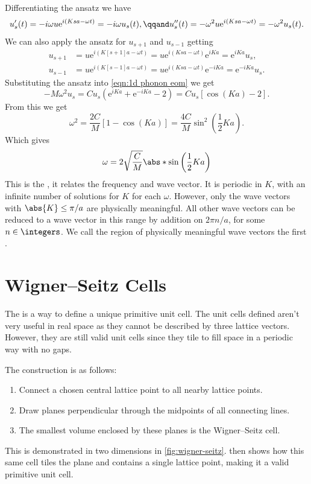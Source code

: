 \documentclass[fleqn]{NotesClass}
\newcommand*{\e}{\mathrm{e}}
\begin{document}
    Differentiating the ansatz we have
    \begin{equation}
        u_s'(t) = -i\omega u\e^{i(Ksa - \omega t)} = -i\omega u_s(t), \qqand u_s''(t) = -\omega^2u\e^{i(Ksa - \omega t)} = -\omega^2 u_s(t).
    \end{equation}
    We can also apply the ansatz for \(u_{s+1}\) and \(u_{s-1}\) getting
    \begin{align}
        u_{s+1} &= u\e^{i(K[s+1]a - \omega t)} = u\e^{i(Ksa - \omega t)}\e^{iKa} = \e^{iKa}u_s,\\
        u_{s-1} &= u\e^{i(K[s-1]a - \omega t)} = u\e^{i(Ksa - \omega t)}\e^{-iKa} = \e^{-iKa}u_s.
    \end{align}
    Substituting the ansatz into \cref{eqn:1d phonon eom} we get
    \begin{equation}
        -M\omega^2 u_s = Cu_s(\e^{iKa} + \e^{-iKa} - 2) = Cu_s[\cos(Ka) - 2].
    \end{equation}
    From this we get
    \begin{equation}
        \omega^2 = \frac{2C}{M}[1 - \cos(Ka)] = \frac{4C}{M}\sin^2\left( \frac{1}{2}Ka \right).
    \end{equation}
    Which gives
    \begin{equation}
        \omega = 2\sqrt{\frac{C}{M}} \abs*{\sin\left( \frac{1}{2}Ka \right)}
    \end{equation}
    This is the , it relates the frequency and wave vector.
    It is periodic in \(K\), with an infinite number of solutions for \(K\) for each \(\omega\).
    However, only the wave vectors with \(\abs{K} \le \pi/a\) are physically meaningful.
    All other wave vectors can be reduced to a wave vector in this range by addition on \(2\pi n/a\), for some \(n \in \integers\).
    We call the region of physically meaningful wave vectors the first .
    
    \section{Wigner--Seitz Cells}\label{sec:wigner-seitz cells}
    The  is a way to define a unique primitive unit cell.
    The unit cells defined aren't very useful in real space as they cannot be described by three lattice vectors.
    However, they are still valid unit cells since they tile to fill space in a periodic way with no gaps.
    
    The construction is as follows:
    \begin{enumerate}
        \item Connect a chosen central lattice point to all nearby lattice points.
        \item Draw planes perpendicular through the midpoints of all connecting lines.
        \item The smallest volume enclosed by these planes is the Wigner--Seitz cell.
    \end{enumerate}
    This is demonstrated in two dimensions in \cref{fig:wigner-seitz}.
     then shows how this same cell tiles the plane and contains a single lattice point, making it a valid primitive unit cell.
    
\end{document}
